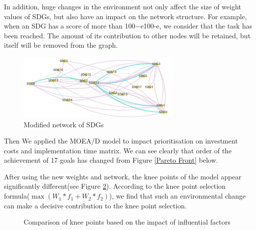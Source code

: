 \documentclass[10pt]{mcmthesis}
\begin{document}
 In addition, huge changes in the environment not only affect the size of weight values of SDGs, but also have an impact on the network structure. For example, when an SDG has a score of more than 100−e100-e, we consider that the task has been reached. The amount of its contribution to other nodes will be retained,  but itself will be removed from the graph.
 
 \begin{figure}[h]
    \centering
    \includegraphics[width=8cm]{figures/graph.jpg}    
    \caption{ Modified network of SDGs}%
    \label{New Network Of SDGs }
\end{figure} 

Then We applied the MOEA/D model to impact prioritisation on investment costs and implementation time matrix. We can see clearly that order of the achievement of 17 goals has changed from Figure \ref{Pareto Front} below.

After using the new weights and network, the knee points of the model appear significantly different(see Figure \ref{knee_compare}).  According to the knee point selection formula($\max (W_1*f_1 + W_2*f_2 )$), we find that such an environmental change can make a decisive contribution to the knee point selection.
 \begin{figure}[H]
    \centering
    
    \caption{ Comparison of knee points based on the impact of influential factors  }%
    \label{knee_compare}
\end{figure}
\end{document}
